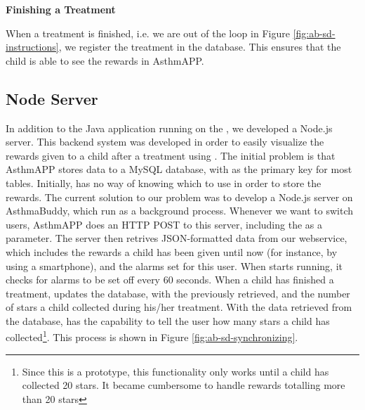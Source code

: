 \textbf{Finishing a Treatment}

When a treatment is finished, i.e. we are out of the  loop in Figure \ref{fig:ab-sd-instructions}, we register the treatment in the database. This ensures that the child is able to see the rewards in AsthmAPP. 


\subsection{Node Server}
\label{sec:node-server}
In addition to the Java application running on the \rpi{}, we developed a Node.js server. This backend system was developed in order to easily visualize the rewards given to a child after a treatment using \buddy{}. The initial problem is that AsthmAPP stores data to a MySQL database, with  as the primary key for most tables. Initially, \buddy{} has no way of knowing which  to use in order to store the rewards. The current solution to our problem was to develop a Node.js server on AsthmaBuddy, which run as a background process. Whenever we want to switch users, AsthmAPP does an HTTP POST to this server, including the  as a parameter. The server then retrives JSON-formatted data from our webservice, which includes the rewards a child has been given until now (for instance, by using a smartphone), and the alarms set for this user. 
When \buddy{} starts running, it checks for alarms to be set off every 60 seconds. When a child has finished a treatment,  updates the database, with the  previously retrieved, and the number of stars a child collected during his/her treatment. With the data retrieved from the database, \buddy{} has the capability to tell the user how many stars a child has collected\footnote{Since this is a prototype, this functionality only works until a child has collected 20 stars. It became cumbersome to handle rewards totalling more than 20 stars}. This process is shown in Figure \ref{fig:ab-sd-synchronizing}.

